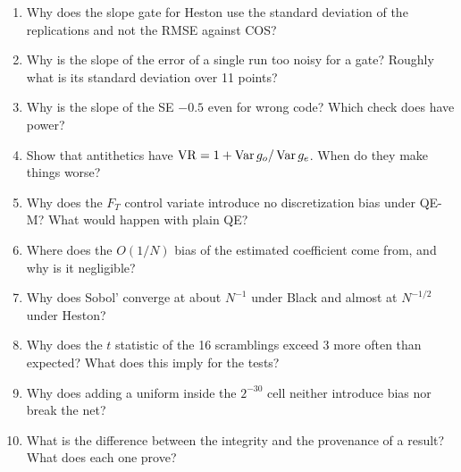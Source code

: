 \begin{domande}
\begin{enumerate}
\item Why does the slope gate for Heston use the standard deviation of the replications and not the RMSE against COS?
\item Why is the slope of the error of a single run too noisy for a gate? Roughly what is its standard deviation over
11 points?
\item Why is the slope of the SE $-0.5$ even for wrong code? Which check does have power?
\item Show that antithetics have $\mathrm{VR}=1+\operatorname{Var} g_o/\operatorname{Var} g_e$. When do they make things worse?
\item Why does the $F_T$ control variate introduce no discretization bias under QE-M? What would happen with plain QE?
\item Where does the $O(1/N)$ bias of the estimated coefficient come from, and why is it negligible?
\item Why does Sobol' converge at about $N^{-1}$ under Black and almost at $N^{-1/2}$ under Heston?
\item Why does the $t$ statistic of the 16 scramblings exceed 3 more often than expected? What does this imply for the
tests?
\item Why does adding a uniform inside the $2^{-30}$ cell neither introduce bias nor break the net?
\item What is the difference between the integrity and the provenance of a result? What does each one prove?
\end{enumerate}
\end{domande}
